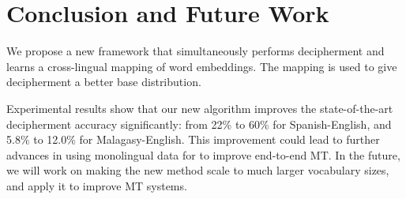 \section{Conclusion and Future Work}

We propose a new framework that simultaneously performs decipherment and learns a cross-lingual mapping of word embeddings. The mapping is used to give decipherment a better base distribution. 

Experimental results show that our new algorithm improves the state-of-the-art decipherment accuracy significantly: from 22\% to 60\% for Spanish-English, and 5.8\% to 12.0\% for Malagasy-English. This improvement could lead to further advances in using monolingual data for to improve end-to-end MT.
In the future, we will work on making the new method scale to much larger vocabulary sizes, and apply it to improve MT systems.